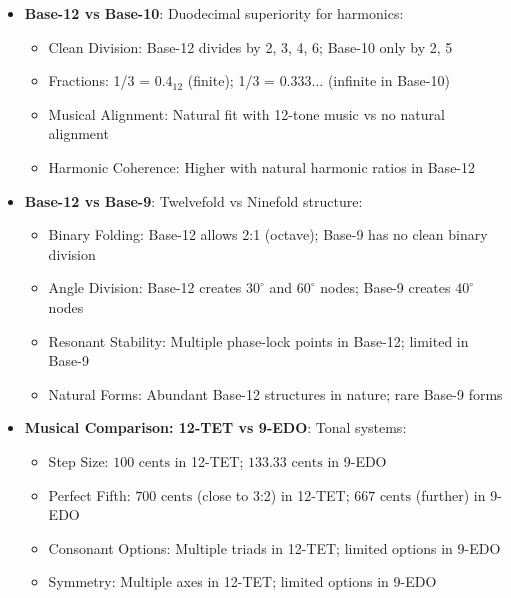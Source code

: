 \begin{itemize}
    \item \texttt{} \textbf{Base-12 vs Base-10}: Duodecimal superiority for harmonics:
    \begin{itemize}
        \item Clean Division: Base-12 divides by 2, 3, 4, 6; Base-10 only by 2, 5
        \item Fractions: 1/3 = \(0.4_{12}\) (finite); 1/3 = \(0.333\ldots\) (infinite in Base-10)
        \item Musical Alignment: Natural fit with 12-tone music vs no natural alignment
        \item Harmonic Coherence: Higher with natural harmonic ratios in Base-12
    \end{itemize}
    
    \item \texttt{} \textbf{Base-12 vs Base-9}: Twelvefold vs Ninefold structure:
    \begin{itemize}
        \item Binary Folding: Base-12 allows 2:1 (octave); Base-9 has no clean binary division
        \item Angle Division: Base-12 creates \(30^\circ\) and \(60^\circ\) nodes; Base-9 creates \(40^\circ\) nodes
        \item Resonant Stability: Multiple phase-lock points in Base-12; limited in Base-9
        \item Natural Forms: Abundant Base-12 structures in nature; rare Base-9 forms
    \end{itemize}
    
    \item \texttt{} \textbf{Musical Comparison: 12-TET vs 9-EDO}: Tonal systems:
    \begin{itemize}
        \item Step Size: \(100 \text{ cents}\) in 12-TET; \(133.33 \text{ cents}\) in 9-EDO
        \item Perfect Fifth: \(700 \text{ cents}\) (close to 3:2) in 12-TET; \(667 \text{ cents}\) (further) in 9-EDO
        \item Consonant Options: Multiple triads in 12-TET; limited options in 9-EDO
        \item Symmetry: Multiple axes in 12-TET; limited options in 9-EDO
    \end{itemize}
\end{itemize}

